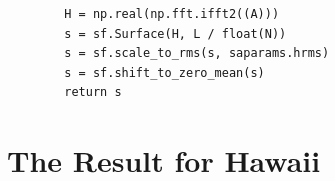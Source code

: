 \documentclass{mcmthesis}
\begin{document}
\begin{appendices}
\begin{lstlisting}
        H = np.real(np.fft.ifft2((A)))
        s = sf.Surface(H, L / float(N))
        s = sf.scale_to_rms(s, saparams.hrms)
        s = sf.shift_to_zero_mean(s)
        return s
\end{lstlisting}

  \newpage
  \section{The Result for Hawaii}

        \begin{figure}[ht]
        \centering

\end{figure}
\end{appendices}
\end{document}
